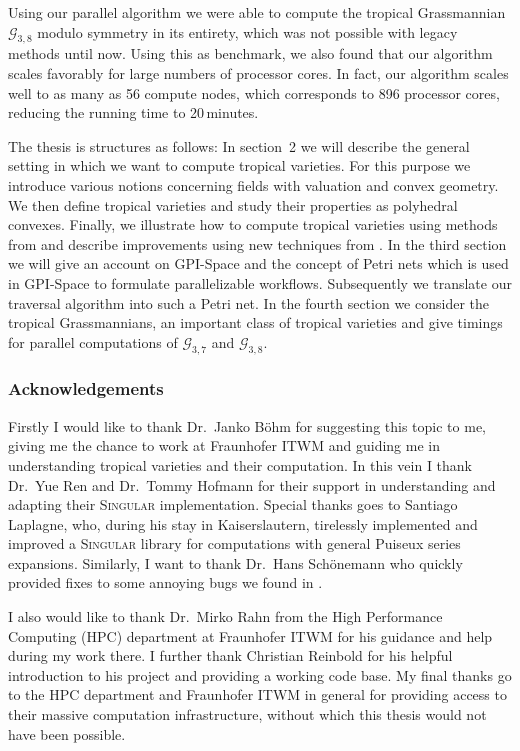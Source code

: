 \documentclass[
  paper=a4,
  titlepage,
  bibliography=totoc,
  pagesize=pdftex
]{scrartcl}
\numberwithin{figure}{section}
\numberwithin{equation}{section}
\numberwithin{table}{section}
\theoremstyle{definition}
\numberwithin{definition}{section}
\begin{document}
Using our parallel algorithm we were able to compute the tropical Grassmannian $\mathcal
G_{3,8}$ modulo symmetry in its entirety, which was not possible with legacy methods until
now. Using this as benchmark, we also found that our algorithm scales favorably for large
numbers of processor cores. In fact, our algorithm scales well to as many as 56 compute
nodes, which corresponds to 896 processor cores, reducing the running time to 20\,minutes.

The thesis is structures as follows: In section~2 we will describe the general setting in
which we want to compute tropical varieties. For this purpose we introduce various notions
concerning fields with valuation and convex geometry. We then define tropical varieties
and study their properties as polyhedral convexes. Finally, we illustrate how to compute
tropical varieties using methods from \cite{compTropVar} and describe improvements using
new techniques from \cite{tropPointsLinks}. In the third section we will give an account
on GPI-Space and the concept of Petri nets which is used in GPI-Space to formulate
parallelizable workflows. Subsequently we translate our traversal algorithm into such a
Petri net. In the fourth section we consider the tropical Grassmannians, an important
class of tropical varieties and give timings for parallel computations of $\mathcal
G_{3,7}$ and $\mathcal G_{3,8}$.

\clearpage
\subsubsection*{Acknowledgements}
Firstly I would like to thank Dr.~Janko Böhm for suggesting this topic to me, giving me
the chance to work at Fraunhofer ITWM and guiding me in understanding tropical varieties
and their computation. In this vein I thank Dr.~Yue Ren and Dr.~Tommy Hofmann for their
support in understanding and adapting their \textsc{Singular} implementation. Special
thanks goes to Santiago Laplagne, who, during his stay in Kaiserslautern, tirelessly
implemented and improved a \textsc{Singular} library for computations with general Puiseux
series expansions. Similarly, I want to thank Dr.~Hans Schönemann who quickly provided
fixes to some annoying bugs we found in .

I also would like to thank Dr.~Mirko Rahn from the High Performance Computing (HPC)
department at Fraunhofer ITWM for his guidance and help during my work there. I further
thank Christian Reinbold for his helpful introduction to his project and providing a
working code base. My final thanks go to the HPC department and Fraunhofer ITWM in general
for providing access to their massive computation infrastructure, without which this
thesis would not have been possible.
\end{document}
